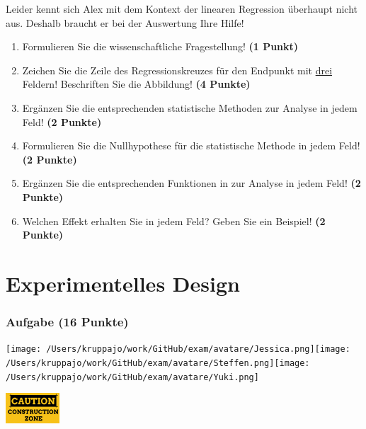 \documentclass[a4paper, 9pt]{scrartcl}\usepackage[]{graphicx}\usepackage[]{xcolor}
\begin{document}
Leider kennt sich Alex mit dem Kontext der linearen Regression überhaupt nicht aus. Deshalb braucht er bei der Auswertung Ihre Hilfe!

\begin{enumerate}
  \item Formulieren Sie die wissenschaftliche Fragestellung! \textbf{(1 Punkt)}
\item Zeichen Sie die Zeile des Regressionskreuzes für den Endpunkt mit \underline{drei} Feldern! Beschriften Sie die Abbildung! \textbf{(4 Punkte)}
\item Ergänzen Sie die entsprechenden statistische Methoden zur Analyse in jedem Feld! \textbf{(2 Punkte)}
\item Formulieren Sie die Nullhypothese für die statistische Methode in jedem Feld! \textbf{(2 Punkte)}
\item Ergänzen Sie die entsprechenden Funktionen in \Rlogo zur Analyse in jedem Feld! \textbf{(2 Punkte)}
\item Welchen Effekt erhalten Sie in jedem Feld? Geben Sie ein Beispiel! \textbf{(2 Punkte)}
\end{enumerate} 
\clearpage
\part{Experimentelles Design}

\section{Aufgabe \hfill (16 Punkte)}


 
\begin{minipage}[t]{0.5\textwidth}
\texttt{[image: /Users/kruppajo/work/GitHub/exam/avatare/Jessica.png]}\hspace{-4mm}\texttt{[image: /Users/kruppajo/work/GitHub/exam/avatare/Steffen.png]}\hspace{-4mm}\texttt{[image: /Users/kruppajo/work/GitHub/exam/avatare/Yuki.png]}
\end{minipage}
\begin{minipage}[t]{0.5\textwidth}
\hfill
\href{https://youtu.be/wJqsNV1hOW8}{\includegraphics[width = 2cm]{img/caution}}
\end{minipage}
\end{document}
